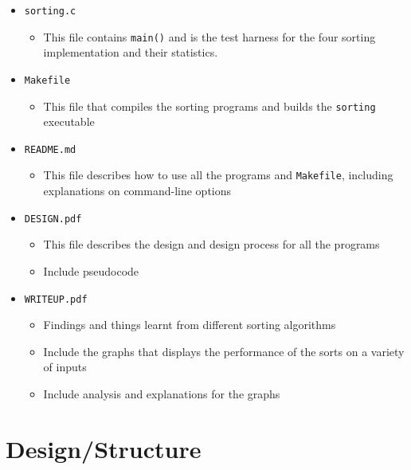 \documentclass[12pt]{article}
\begin{document}
\begin{itemize}
\begin{itemize}
   \end{itemize}
   \item \texttt{sorting.c}
   \begin{itemize}
     \item This file contains \texttt{main()} and is the test harness for the four sorting implementation and their statistics.
   \end{itemize}
   \item \texttt{Makefile}
   \begin{itemize}
     \item This file that compiles the sorting programs and builds the \texttt{sorting} executable
   \end{itemize}
   \item \texttt{README.md}
   \begin{itemize}
     \item This file describes how to use all the programs and \texttt{Makefile}, including explanations on command-line options
   \end{itemize}
   \item \texttt{DESIGN.pdf}
   \begin{itemize}
     \item This file describes the design and design process for all the programs
     \item Include pseudocode
   \end{itemize}
   \item \texttt{WRITEUP.pdf}
   \begin{itemize}
     \item Findings and things learnt from different sorting algorithms
     \item Include the graphs that displays the performance of the sorts on a variety of inputs
     \item Include analysis and explanations for the graphs
   \end{itemize}
 \end{itemize}

\section{Design/Structure}
\end{document}
